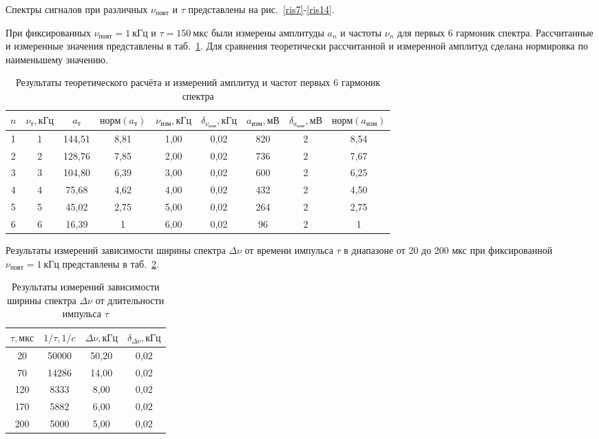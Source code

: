 \documentclass[a4paper, 12pt]{article}
\begin{document}
Спектры сигналов при различных $\nu_{повт}$ и $\tau$ представлены на рис.~\ref{ris7}-\ref{ris14}.

При фиксированных $\nu_{повт} = 1~кГц$ и $\tau = 150~мкс$ были измерены амплитуды $a_n$ и частоты $\nu_n$ для первых 6 гармоник спектра. Рассчитанные и измеренные значения представлены в таб.~\ref{tab1}. Для сравнения теоретически рассчитанной и измеренной амплитуд сделана нормировка по наименьшему значению.

\begin{table}[h!]
\begin{center}
\begin{tabular}{|c|c|c|c|c|c|c|c|c|}
\hline
$n$ & $\nu_{т}, кГц$ & $a_{т}$ & $норм(a_{т})$ & $\nu_{изм}, кГц$ & $\delta_{\nu_{изм}}, кГц$ & $a_{изм}, мВ$ & $\delta_{a_{изм}}, мВ$ & $норм(a_{изм})$ \\ \hline
1 & 1 & 144,51 & 8,81 & 1,00 & 0,02 & 820 & 2 & 8,54 \\ \hline
2 & 2 & 128,76 & 7,85 & 2,00 & 0,02 & 736 & 2 & 7,67 \\ \hline
3 & 3 & 104,80 & 6,39 & 3,00 & 0,02 & 600 & 2 & 6,25 \\ \hline
4 & 4 & 75,68 & 4,62 & 4,00 & 0,02 & 432 & 2 & 4,50 \\ \hline
5 & 5 & 45,02 & 2,75 & 5,00 & 0,02 & 264 & 2 & 2,75 \\ \hline
6 & 6 & 16,39 & 1 & 6,00 & 0,02 & 96 & 2 & 1 \\ \hline
\end{tabular}
\end{center}
\caption{Результаты теоретического расчёта и измерений амплитуд и частот первых 6 гармоник спектра}
\label{tab1}
\end{table}

Результаты измерений зависимости ширины спектра $\Delta{\nu}$ от времени импульса $\tau$ в диапазоне от 20 до 200 мкс при фиксированной $\nu_{повт} = 1~кГц$ представлены в таб.~\ref{tab2}.

\begin{table}[h!]
\begin{center}
\begin{tabular}{|c|c|c|c|}
\hline
$\tau, мкс$ & $1/\tau, 1/c$ & $\Delta{\nu}, кГц$ & $\delta_{\Delta{\nu}}, кГц$ \\ \hline
20 & 50000 & 50,20 & 0,02 \\ \hline
70 & 14286 & 14,00 & 0,02 \\ \hline
120 & 8333 & 8,00 & 0,02 \\ \hline
170 & 5882 & 6,00 & 0,02 \\ \hline
200 & 5000 & 5,00 & 0,02 \\ \hline
\end{tabular}
\end{center}
\caption{Результаты измерений зависимости ширины спектра $\Delta{\nu}$ от длительности импульса $\tau$}
\label{tab2}
\end{table}
\end{document}

